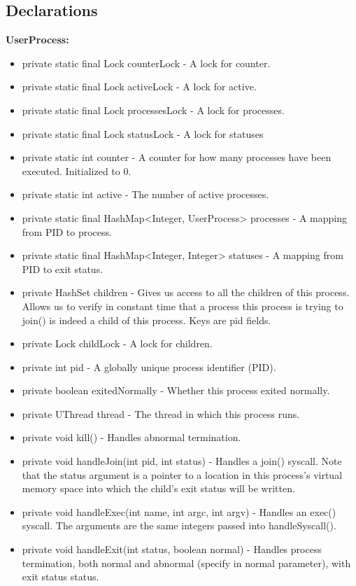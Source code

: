 \documentclass{article}
\begin{document}
\subsection{Declarations}
\textbf{UserProcess:}
\begin{itemize}
\item{\ttfamily private static final Lock counterLock} - A lock for {\ttfamily counter}.
\item{\ttfamily private static final Lock activeLock} - A lock for {\ttfamily active}.
\item{\ttfamily private static final Lock processesLock} - A lock for {\ttfamily processes}.
\item{\ttfamily private static final Lock statusLock} - A lock for {\ttfamily statuses}
\item{\ttfamily private static int counter} - A counter for how many processes have been executed. Initialized to 0.
\item{\ttfamily private static int active} - The number of active processes.
\item{\ttfamily private static final HashMap<Integer, UserProcess> processes} - A mapping from PID to process.
\item{\ttfamily private static final HashMap<Integer, Integer> statuses} - A mapping from PID to exit status.
\item{\ttfamily private HashSet children} - Gives us access to all the children of this process. Allows us to verify in constant time that a process this process is trying to join() is indeed a child of this process. Keys are pid fields.
\item{\ttfamily private Lock childLock} - A lock for {\ttfamily children}.
\item{\ttfamily private int pid} - A globally unique process identifier (PID).
\item{\ttfamily private boolean exitedNormally} - Whether this process exited normally.
\item{\ttfamily private UThread thread} - The thread in which this process runs.
\item{\ttfamily private void kill()} - Handles abnormal termination.
\item{\ttfamily private void handleJoin(int pid, int status)} - Handles a {\ttfamily join()} syscall. Note that the status argument is a pointer to a location in this process's virtual memory space into which the child's exit status will be written.
\item{\ttfamily private void handleExec(int name, int argc, int argv)} - Handles an {\ttfamily exec()} syscall. The arguments are the same integers passed into {\ttfamily handleSyscall()}.
\item{\ttfamily private void handleExit(int status, boolean normal)} - Handles process termination, both normal and abnormal (specify in {\ttfamily normal} parameter), with exit status {\ttfamily status}.
\end{itemize}
\end{document}
